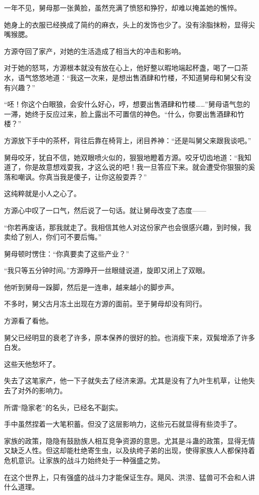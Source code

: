 \begin{this_body}
一年不见，舅母那一张黄脸，虽然充满了愤怒和狰狞，却难以掩盖她的憔悴。

她身上的衣服已经换成了简约的麻衣，头上的发饰也少了。没有涂脂抹粉，显得尖嘴猴腮。

方源夺回了家产，对她的生活造成了相当大的冲击和影响。

对于她的怒骂，方源根本就没有放在心上，他好整以暇地端起杯盏，喝了一口茶水，语气悠悠地道：“我这一次来，是想出售酒肆和竹楼，不知道舅母和舅父有没有兴趣？”

“呸！你这个白眼狼，会安什么好心，哼，想要出售酒肆和竹楼……”舅母语气忽的一滞，她终于反应过来，脸上露出不可置信的神色。“什么，你要出售酒肆和竹楼？”

方源放下手中的茶杯，背往后靠在椅背上，闭目养神：“还是叫舅父来跟我谈吧。”

舅母咬牙，犹自不信，她双眼喷火似的，狠狠地瞪着方源。咬牙切齿地道：“我知道了，你是故意想戏耍我，才这么说的吧！我一旦答应下来。就会遭受你狠狠的奚落和嘲讽。你真当我是傻子，让你这般耍弄？”

这纯粹就是小人之心了。

方源心中叹了一口气，然后说了一句话。就让舅母改变了态度——

“你若再废话，那我就走了。我相信其他人对这份家产也会很感兴趣，到时候，我卖给了别人，你们可不要后悔。”

舅母顿时愣住：“你真要卖了这些产业？”

“我只等五分钟时间。”方源睁开一丝眼缝说道，旋即又闭上了双眼。

他听到舅母一跺脚，然后是一连串，越来越小的脚步声。

不多时，舅父古月冻土出现在方源的面前。至于舅母却没有同行。

方源看了看他。

舅父已经明显的衰老了许多，原本保养的很好的脸。也消瘦下来，双鬓增添了许多白发。

这些天他愁坏了。

失去了这笔家产，他一下子就失去了经济来源。尤其是没有了九叶生机草，让他失去了对外的影响力。

所谓“隐家老”的名头，已经名不副实。

手中虽然捏着一大笔积蓄。但没了这层影响力，这些元石就显得有些烫手了。

家族的政策，隐隐有鼓励族人相互竞争资源的意思。尤其是斗蛊的政策，显得无情又缺乏人性。但这却能杜绝寄生虫，以及纨绔子弟的出现，使得家族人人都保持着危机意识。让家族的战斗力始终处于一种强盛之势。

在这个世界上，只有强盛的战斗力才能保证生存。飓风、洪涝、猛兽可不会和人讲什么道理。


\end{this_body}
